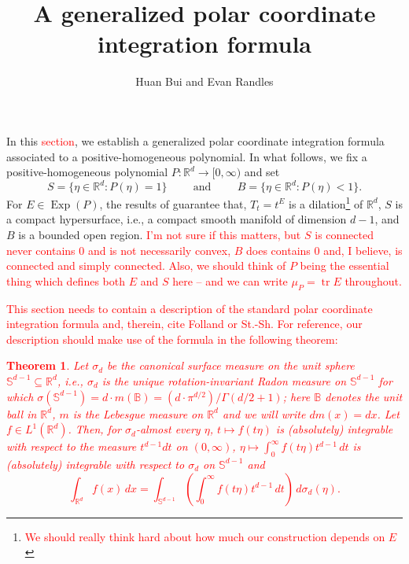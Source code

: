 \documentclass[11pt]{article}
\author{Huan Bui and Evan Randles}
\title{A generalized polar coordinate integration formula}
\date{}
\theoremstyle{theorem}
\newtheorem{theorem}{Theorem}[section]
\newcommand\Exp{\operatorname{Exp}}
\newcommand\tr{\operatorname{tr}}
\begin{document}
\maketitle

In this \textcolor{red}{section}, we establish a generalized polar coordinate integration formula associated to a positive-homogeneous polynomial. In what follows, we fix a positive-homogeneous polynomial $P:\mathbb{R}^d\to [0,\infty)$ and set
\begin{equation*}
S=\{\eta\in\mathbb{R}^d:P(\eta)=1\}\hspace{1cm}\mbox{and}\hspace{1cm}B=\{\eta\in\mathbb{R}^d:P(\eta)<1\}. 
\end{equation*}
For $E\in\Exp(P)$, the results of \cite{Randles2017} guarantee that, $T_t=t^E$ is a dilation\footnote{\textcolor{red}{We should really think hard about how much our construction depends on $E$}} of $\mathbb{R}^d$, $S$ is a compact hypersurface, i.e., a compact smooth manifold of dimension $d-1$, and $B$ is a bounded open region. \textcolor{red}{I'm not sure if this matters, but $S$ is connected never contains $0$ and is not necessarily convex, $B$ does contains $0$ and, I believe, is connected and simply connected. Also, we should think of $P$ being the essential thing which defines both $E$ and $S$ here -- and we can write $\mu_P=\tr E$ throughout. }

\textcolor{red}{This section needs to contain a description of the standard polar coordinate integration formula and, therein, cite Folland or St.-Sh. For reference, our description should make use of the formula in the following theorem:
\begin{theorem}
Let $\sigma_d$ be the canonical surface measure on the unit sphere $\mathbb{S}^{d-1}\subseteq \mathbb{R}^d$, i.e., $\sigma_d$ is the unique rotation-invariant Radon measure on $\mathbb{S}^{d-1}$ for which $\sigma(\mathbb{S}^{d-1})=d\cdot m(\mathbb{B})=(d\cdot\pi^{d/2})/\Gamma(d/2+1)$;  here $\mathbb{B}$ denotes the unit ball in $\mathbb{R}^d$, $m$ is the Lebesgue measure on $\mathbb{R}^d$ and we will write $dm(x)=dx$. Let $f\in L^1(\mathbb{R}^d)$. Then, for $\sigma_d$-almost every $\eta$, $t\mapsto f(t\eta)$ is (absolutely) integrable with respect to the measure $t^{d-1}dt$ on $(0,\infty)$, $\eta\mapsto \int_0^\infty f(t\eta)t^{d-1}\,dt$ is (absolutely) integrable with respect to $\sigma_d$ on $\mathbb{S}^{d-1}$ and
\begin{equation}\label{eq:StandardPolarIntegrationFormula}
\int_{\mathbb{R}^d}f(x)\,dx=\int_{\mathbb{S}^{d-1}}\left(\int_0^\infty f(t\eta)t^{d-1}\,dt\right)\,d\sigma_d(\eta).
\end{equation}
\end{theorem}}
\end{document}
